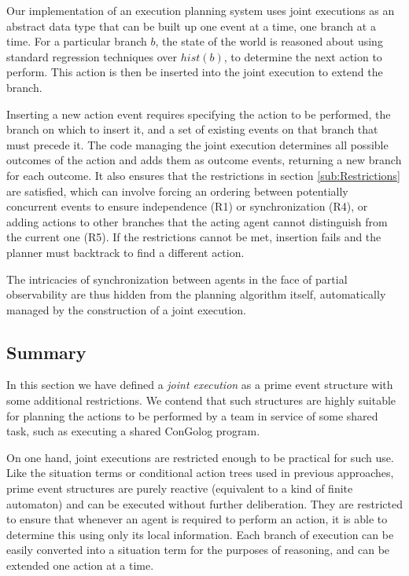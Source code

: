 Our implementation of an execution planning system uses joint executions
as an abstract data type that can be built up one event at a time,
one branch at a time. For a particular branch $b$, the state of the
world is reasoned about using standard regression techniques over
$hist(b)$, to determine the next action to perform. This action is
then be inserted into the joint execution to extend the branch.

Inserting a new action event requires specifying the action to be
performed, the branch on which to insert it, and a set of existing
events on that branch that must precede it. The code managing the
joint execution determines all possible outcomes of the action and
adds them as outcome events, returning a new branch for each outcome.
It also ensures that the restrictions in section \ref{sub:Restrictions}
are satisfied, which can involve forcing an ordering between potentially
concurrent events to ensure independence (R1) or synchronization (R4),
or adding actions to other branches that the acting agent cannot distinguish
from the current one (R5). If the restrictions cannot be met, insertion
fails and the planner must backtrack to find a different action.

The intricacies of synchronization between agents in the face of partial
observability are thus hidden from the planning algorithm itself,
automatically managed by the construction of a joint execution.


\subsection{Summary}

In this section we have defined a \emph{joint execution} as a prime
event structure with some additional restrictions. We contend that
such structures are highly suitable for planning the actions to be
performed by a team in service of some shared task, such as executing
a shared ConGolog program.

On one hand, joint executions are restricted enough to be practical
for such use. Like the situation terms or conditional action trees
used in previous approaches, prime event structures are purely reactive
(equivalent to a kind of finite automaton) and can be executed without
further deliberation. They are restricted to ensure that whenever
an agent is required to perform an action, it is able to determine
this using only its local information. Each branch of execution can
be easily converted into a situation term for the purposes of reasoning,
and can be extended one action at a time.

